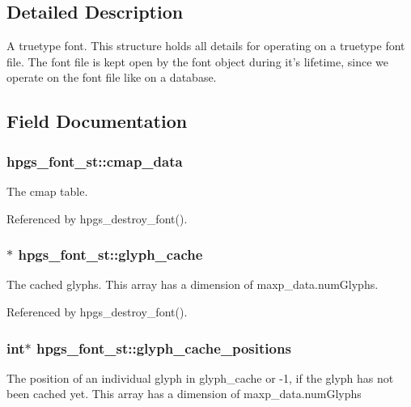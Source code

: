 \subsection{Detailed Description}
A truetype font. This structure holds all details for operating on a truetype font file. The font file is kept open by the font object during it's lifetime, since we operate on the font file like on a database. 

\subsection{Field Documentation}
\subsubsection[{cmap\_\-data}]{ {\bf hpgs\_\-font\_\-st::cmap\_\-data}}\label{structhpgs__font__st_ab5dde9d6e746d6f1988c64f315a41090}
The cmap table. 

Referenced by hpgs\_\-destroy\_\-font().

\subsubsection[{glyph\_\-cache}]{$\ast$ {\bf hpgs\_\-font\_\-st::glyph\_\-cache}}\label{structhpgs__font__st_a91fa96300139ac68055d5381f21cd2f9}
The cached glyphs. This array has a dimension of maxp\_\-data.numGlyphs. 

Referenced by hpgs\_\-destroy\_\-font().

\subsubsection[{glyph\_\-cache\_\-positions}]{\setlength{\rightskip}{0pt plus 5cm}int$\ast$ {\bf hpgs\_\-font\_\-st::glyph\_\-cache\_\-positions}}\label{structhpgs__font__st_a26a6c7172b53abe1a34f150ad47c2410}
The position of an individual glyph in {\ttfamily glyph\_\-cache} or -\/1, if the glyph has not been cached yet. This array has a dimension of maxp\_\-data.numGlyphs 

